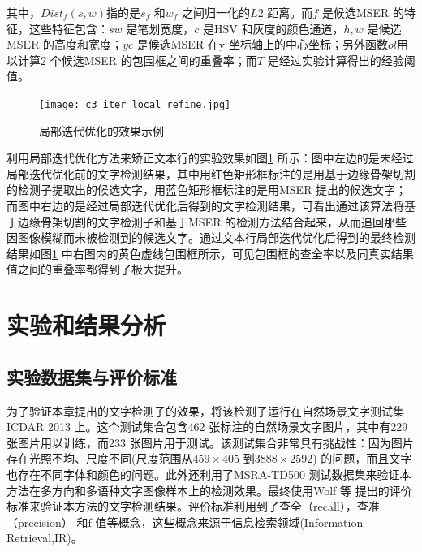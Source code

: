     其中，$Dist_f(s,w)$指的是$s_f$ 和$w_f$ 之间归一化的$L2$ 距离。而$f$ 是候选MSER 的特征，这些特征包含：$sw$ 是笔划宽度，$c$ 是HSV 和灰度的颜色通道，$h,w$ 是候选MSER 的高度和宽度；$yc$ 是候选MSER 在y 坐标轴上的中心坐标；另外函数$ol$用以计算2 个候选MSER 的包围框之间的重叠率；而$T$ 是经过实验计算得出的经验阈值。

    \begin{figure}[!h]
    \centering
    \texttt{[image: c3\_iter\_local\_refine.jpg]} \caption{局部迭代优化的效果示例}
    \label{fig.c3_iter_local_refine}
    \end{figure}

    利用局部迭代优化方法来矫正文本行的实验效果如图\ref{fig.c3_iter_local_refine} 所示：图中左边的是未经过局部迭代优化前的文字检测结果，其中用红色矩形框标注的是用基于边缘骨架切割的检测子提取出的候选文字，用蓝色矩形框标注的是用MSER 提出的候选文字；而图中右边的是经过局部迭代优化后得到的文字检测结果，可看出通过该算法将基于边缘骨架切割的文字检测子和基于MSER 的检测方法结合起来，从而追回那些因图像模糊而未被检测到的候选文字。通过文本行局部迭代优化后得到的最终检测结果如图\ref{fig.c3_iter_local_refine} 中右图内的黄色虚线包围框所示，可见包围框的查全率以及同真实结果值之间的重叠率都得到了极大提升。

    \section{实验和结果分析}

        \subsection{实验数据集与评价标准}

        为了验证本章提出的文字检测子的效果，将该检测子运行在自然场景文字测试集ICDAR 2013 上。这个测试集合包含462 张标注的自然场景文字图片，其中有229 张图片用以训练，而233 张图片用于测试。该测试集合非常具有挑战性：因为图片存在光照不均、尺度不同(尺度范围从$459 \times 405$ 到$3888 \times 2592$) 的问题，而且文字也存在不同字体和颜色的问题。此外还利用了MSRA-TD500 测试数据集来验证本方法在多方向和多语种文字图像样本上的检测效果。最终使用Wolf 等\cite{Wolf2006Object} 提出的评价标准来验证本方法的文字检测结果。评价标准利用到了查全（recall），查准（precision） 和f 值等概念，这些概念来源于信息检索领域(Information Retrieval,IR)。

